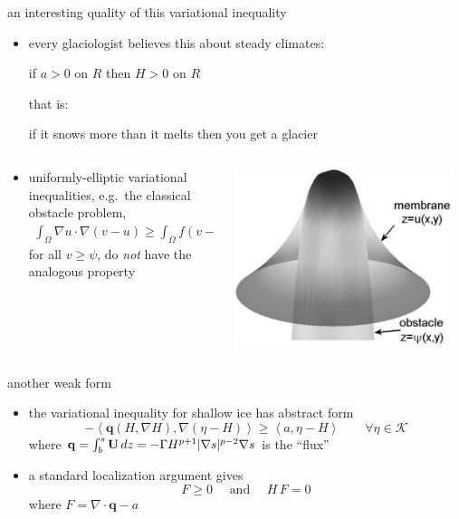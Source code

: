 \documentclass[hide notes,intlimits]{beamer}
\newcommand{\Kcal}{\mathcal{K}}
\newcommand{\bq}{\mathbf{q}}
\newcommand{\Div}{\nabla\cdot}
\newcommand{\grad}{\nabla}
\newcommand{\ip}[2]{\ensuremath{\left<#1,#2\right>}}
\begin{document}
\begin{frame}{an interesting quality of this variational inequality} 
\begin{itemize}
\item every glaciologist believes this about steady climates:
\begin{center}
 if $a>0$ on $R$ then $H>0$ on $R$
\end{center}
that is:
\begin{center}
 if it snows more than it melts then you get a glacier
\end{center}
\end{itemize}
\begin{columns}
\begin{column}{0.6\textwidth}
\begin{itemize}
\small
\item uniformly-elliptic variational inequalities, e.g.~the classical obstacle problem,
\begin{align*}
\int_{\Omega}  \nabla u \cdot \nabla (v - u)  \ge  \int_{\Omega} f (v - u),
\end{align*}
for all $v\ge \psi$, do \emph{not} have the analogous property
\end{itemize}
\end{column}
\begin{column}{0.35\textwidth}
\includegraphics[width=0.95\textwidth]{classicalobs}
\end{column}
\end{columns}
\end{frame}


\begin{frame}{another weak form} 
\begin{itemize}
\item the variational inequality for shallow ice has abstract form
  $$- \ip{\bq(H,\grad H)}{\grad(\eta - H)} \ge \ip{a}{\eta-H} \qquad \forall \eta \in \Kcal$$
where $\bq=\int_b^s {\bf U}\, dz=-\Gamma H^{p+1} |\grad s|^{p-2} \grad s$ is the ``flux''
\item a standard localization argument gives
  $$F \ge 0 \quad \text{ and } \quad H\,F = 0$$
where $F = \Div \bq - a$
\end{itemize}
\end{frame}
\end{document}
